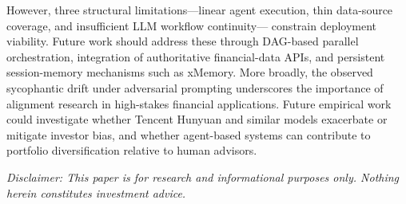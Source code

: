 \documentclass[11pt,a4paper]{article}
\begin{document}
However, three structural limitations---linear agent execution, thin
data-source coverage, and insufficient LLM workflow continuity---
constrain deployment viability. Future work should address these through
DAG-based parallel orchestration, integration of authoritative
financial-data APIs, and persistent session-memory mechanisms such as
xMemory. More broadly, the observed sycophantic drift under adversarial
prompting underscores the importance of alignment research in
high-stakes financial applications. Future empirical work could
investigate whether Tencent Hunyuan and similar models exacerbate or
mitigate investor bias, and whether agent-based systems can contribute
to portfolio diversification relative to human advisors.

\medskip
\noindent\textit{Disclaimer: This paper is for research and
informational purposes only. Nothing herein constitutes investment
advice.}
\end{document}
